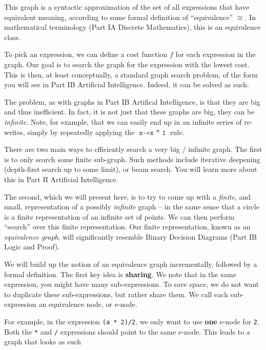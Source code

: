 This graph is a syntactic approximation of the set of all expressions that have equivalent
meaning, according to some formal definition of ``equivalence'' $\cong$. In mathematical terminology
(\textsf{Part IA Discrete Mathematics}), this is an equivalence class.

To pick an expression, we can define a cost function $f$ for each expression in the graph. Our goal is to search the graph for the expression with the lowest cost. This is then, at least conceptually, a standard graph search problem, of the form you will see in \textsf{Part IB Artificial Intelligence}. Indeed, it can be solved as such. 

The problem, as with graphs in \textsf{Part IB Artifical Intelligence}, is that they are big and thus inefficient. In fact, it is not just that these graphs are big, they can be \textit{infinite}. Note, for example, that we can easily end up in an infinite series of re-writes, simply by repeatedly applying the $\texttt{x} \to \texttt{x * 1}$ rule. 

There are two main ways to efficiently search a very big / infinite graph. The first is to only search some finite sub-graph. Such methods include iterative deepening (depth-first search up to some limit), or beam search. You will learn more about this in \textsf{Part II Artificial Intelligence}.

The second, which we will present here, is to try to come up with a \textit{finite}, and small, representation of a possibly \textit{infinite} graph -- in the same sense that a circle is a finite representation of an infinite set of points. We can then perform ``search'' over this finite representation. Our finite representation, known as an \textit{equivalence graph}, will significantly resemble Binary Decision Diagrams (\textsf{Part IB Logic and Proof}). 

We will build up the notion of an equivalence graph incrementally, followed by a formal definition. The first key idea is \textbf{sharing}. We note that in the same expression, you might have many sub-expressions. To save space, we do not want to duplicate these sub-expressions, but rather share them. 
We call each sub-expression an equivalence node, or e-node. 

For example, in the expression \texttt{(a * 2)/2}, we only want to use \textbf{one} e-node for \texttt{2}. Both the \texttt{*} and \texttt{/} expressions 
should point to the same e-node. This leads to a graph that looks as such


